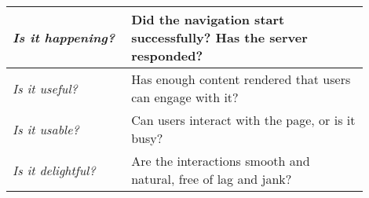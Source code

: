 









 
\begin{center}
\small
	\begin{tabular}{ | p{0.3\linewidth} | p{0.6\linewidth} | }
	\hline
	\textit{Is it happening?} & 	Did the navigation start successfully? Has the server responded? \\
	\hline
	\textit{Is it useful?} & Has enough content rendered that users can engage with it? \\
	\hline
	\textit{Is it usable?} & Can users interact with the page, or is it busy? \\
	\hline
	\textit{Is it delightful?} & Are the interactions smooth and natural, free of lag and jank? \\
	\hline
	\end{tabular}
\end{center}












